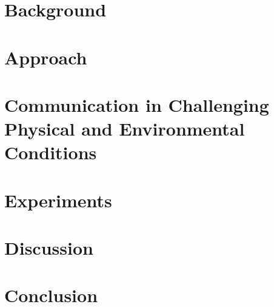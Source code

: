 \documentclass[3p,times,preprint,number,round]{elsarticle}
\theoremstyle{definition}
\newcommand{\acisiot} {s\textbf{A}fety and se\textbf{C}ur\textbf{I}ty as\textbf{S}urrance for critical \textbf{IoT} systems}
\newcommand{\G}[1]{\textbf{#1}}
\newcommand{\hermesdesign} {\G{H}uman-C\G{E}ntric Collabo\G{R}ative Architectural Decision-\G{M}aking for S\G{E}cure \G{S}ystem Design}
\newcommand{\includesection}[1] {\label{#1}\begin{sloppypar}\end{sloppypar}}
\begin{document}
\section{Background}
\includesection{background}


\section{Approach}
\includesection{approach}















\section{Communication in Challenging Physical and Environmental Conditions}
\label{communication}
\includesection{communication}

 
\section{Experiments}
\includesection{evaluation}


\section{Discussion}
\includesection{discussion}






\section{Conclusion}
\includesection{conclusion}


%
%
%



\end{document}
